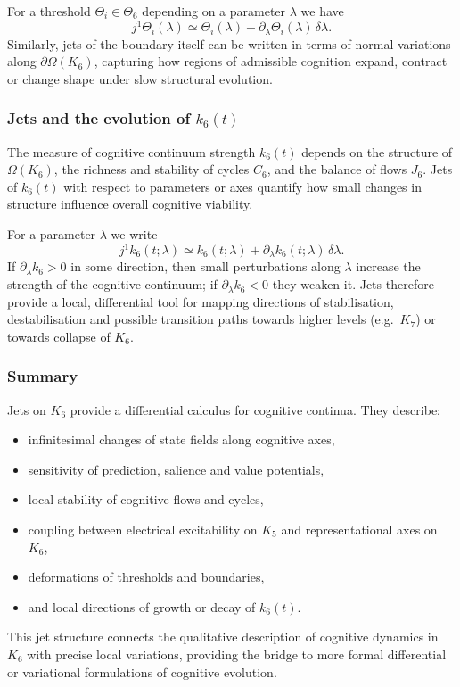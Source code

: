 For a threshold $\Theta_i \in \Theta_6$ depending on a parameter
$\lambda$ we have
\[
  j^1 \Theta_i(\lambda)
  \simeq \Theta_i(\lambda)
        + \partial_{\lambda}\Theta_i(\lambda)\,\delta\lambda.
\]
Similarly, jets of the boundary itself can be written in terms of
normal variations along $\partial\Omega(K_6)$, capturing how
regions of admissible cognition expand, contract or change shape
under slow structural evolution.


\subsubsection{Jets and the evolution of \texorpdfstring{$k_6(t)$}{k6(t)}}

The measure of cognitive continuum strength $k_6(t)$ depends on
the structure of $\Omega(K_6)$, the richness and stability of
cycles $C_6$, and the balance of flows $J_6$.  Jets of $k_6(t)$
with respect to parameters or axes quantify how small changes in
structure influence overall cognitive viability.

For a parameter $\lambda$ we write
\[
  j^1 k_6(t;\lambda)
  \simeq k_6(t;\lambda)
        + \partial_{\lambda}k_6(t;\lambda)\,\delta\lambda.
\]
If $\partial_{\lambda}k_6 > 0$ in some direction, then small
perturbations along $\lambda$ increase the strength of the
cognitive continuum; if $\partial_{\lambda}k_6 < 0$ they weaken
it.  Jets therefore provide a local, differential tool for
mapping directions of stabilisation, destabilisation and
possible transition paths towards higher levels (e.g.\ $K_7$)
or towards collapse of $K_6$.


\subsubsection{Summary}

Jets on $K_6$ provide a differential calculus for cognitive
continua.  They describe:

\begin{itemize}
  \item infinitesimal changes of state fields along cognitive axes,
  \item sensitivity of prediction, salience and value potentials,
  \item local stability of cognitive flows and cycles,
  \item coupling between electrical excitability on $K_5$ and
        representational axes on $K_6$,
  \item deformations of thresholds and boundaries,
  \item and local directions of growth or decay of $k_6(t)$.
\end{itemize}

This jet structure connects the qualitative description of
cognitive dynamics in $K_6$ with precise local variations,
providing the bridge to more formal differential or variational
formulations of cognitive evolution.
